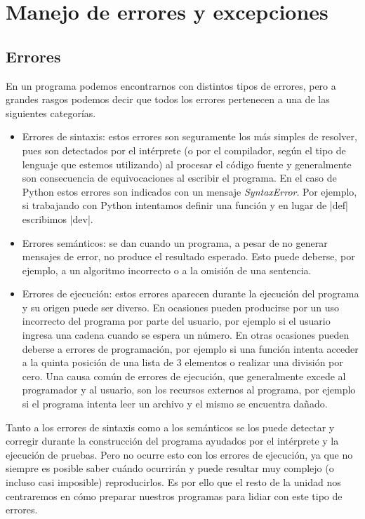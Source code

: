 \chapter{Manejo de errores y excepciones}

\section{Errores}

En un programa podemos encontrarnos con distintos tipos de errores, pero a
grandes rasgos podemos decir que todos los errores pertenecen a una de las
siguientes categorías.

\begin{itemize}

\item Errores de sintaxis: estos errores son seguramente los más simples de
resolver, pues son detectados por el intérprete (o por el compilador, según el
tipo de lenguaje que estemos utilizando) al procesar el código fuente y
generalmente son consecuencia de equivocaciones al escribir el programa. En el
caso de Python estos errores son indicados con un mensaje \emph{SyntaxError}.
Por ejemplo, si trabajando con Python intentamos definir una función y en
lugar de |def| escribimos |dev|.

\item Errores semánticos: se dan cuando un programa, a pesar de no generar
mensajes de error, no produce el resultado esperado. Esto puede deberse, por
ejemplo, a un algoritmo incorrecto o a la omisión de una sentencia.

\item Errores de ejecución: estos errores aparecen durante la ejecución del
programa y su origen puede ser diverso. En ocasiones pueden producirse por un
uso incorrecto del programa por parte del usuario, por ejemplo si el usuario
ingresa una cadena cuando se espera un número. En otras ocasiones pueden
deberse a errores de programación, por ejemplo si una función intenta acceder
a la quinta posición de una lista de 3 elementos o realizar una división por
cero. Una causa común de errores de ejecución, que generalmente excede al
programador y al usuario, son los recursos externos al programa, por ejemplo
si el programa intenta leer un archivo y el mismo se encuentra dañado.

\end{itemize}

Tanto a los errores de sintaxis como a los semánticos se los puede detectar y
corregir durante la construcción del programa ayudados por el intérprete y
la ejecución de pruebas. Pero no ocurre esto con los errores de ejecución, ya
que no siempre es posible saber cuándo ocurrirán y puede resultar muy complejo
(o incluso casi imposible) reproducirlos. Es por ello que el resto de la
unidad nos centraremos en cómo preparar nuestros programas para lidiar con
este tipo de errores.

